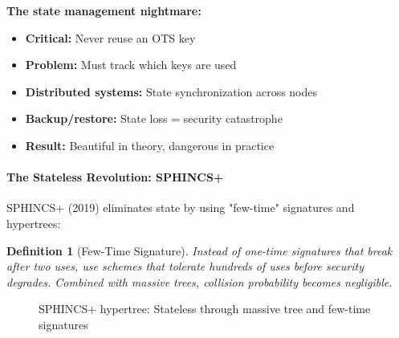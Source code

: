 \documentclass[11pt,a4paper]{article}
\newtheorem{definition}{Definition}
\begin{document}
\textbf{The state management nightmare:}
\begin{itemize}
    \item \textbf{Critical:} Never reuse an OTS key
    \item \textbf{Problem:} Must track which keys are used
    \item \textbf{Distributed systems:} State synchronization across nodes
    \item \textbf{Backup/restore:} State loss = security catastrophe
    \item \textbf{Result:} Beautiful in theory, dangerous in practice
\end{itemize}

\paragraph{The Stateless Revolution: SPHINCS+}

SPHINCS+ (2019) eliminates state by using "few-time" signatures and hypertrees:

\begin{definition}[Few-Time Signature]
Instead of one-time signatures that break after two uses, use schemes that tolerate hundreds of uses before security degrades. Combined with massive trees, collision probability becomes negligible.
\end{definition}

\begin{figure}[h]
\centering
{}
\caption{SPHINCS+ hypertree: Stateless through massive tree and few-time signatures}
\end{figure}
\end{document}
